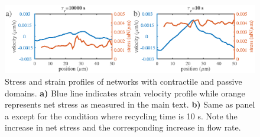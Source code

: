 \begin{figure}[h!]
\centering
\includegraphics[width=\hsize]{active/figures/figure6S}
\caption{\label{fig:combo_prof}  Stress and strain profiles of networks with contractile and passive domains.  \textbf{a)} Blue line indicates strain velocity profile while orange represents net stress as measured in the main text. \textbf{b)} Same as panel a except for the condition where recycling time is 10 s.  Note the increase in net stress and the corresponding increase in flow rate. }
\end{figure}
